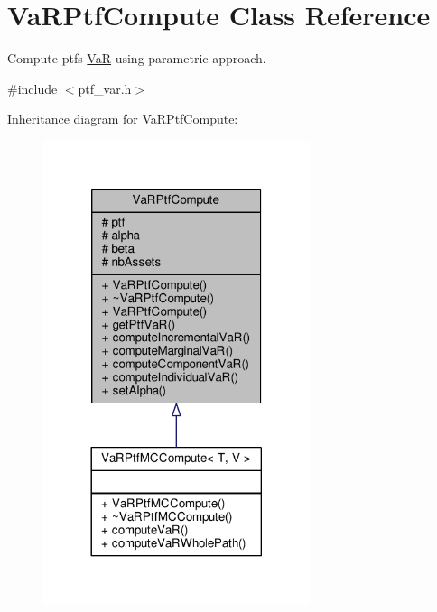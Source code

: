 \hypertarget{classVaRPtfCompute}{}\section{Va\+R\+Ptf\+Compute Class Reference}
\label{classVaRPtfCompute}


Compute ptf\textquotesingle{}s \hyperlink{classVaR}{VaR} using parametric approach.  




{\ttfamily \#include $<$ptf\+\_\+var.\+h$>$}



Inheritance diagram for Va\+R\+Ptf\+Compute\+:
\nopagebreak
\begin{figure}[H]
\begin{center}
\leavevmode
\includegraphics[width=221pt]{classVaRPtfCompute__inherit__graph}
\end{center}
\end{figure}


